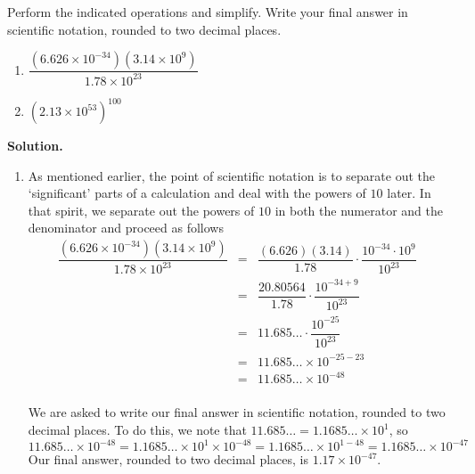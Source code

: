\documentclass{ximera}
\begin{document}
\begin{example} \label{scientificnotationex} Perform the indicated operations and simplify.  Write your final answer in scientific notation, rounded to two decimal places.

\begin{multicols}{2}

\begin{enumerate}

\item  $\dfrac{\left(6.626 \times 10^{-34} \right) \left(3.14 \times 10^{9}\right)}{1.78 \times 10^{23}}$

\item  $\left(2.13 \times 10^{53}\right)^{100}$

\end{enumerate}

\end{multicols}

{\bf Solution.}

\begin{enumerate}

\item  As mentioned earlier, the point of scientific notation is to separate out the `significant' parts of a calculation and deal with the powers of $10$ later.  In that spirit, we separate out the powers of $10$ in both the numerator and the denominator and proceed as follows \[ \begin{array}{rclr}

\dfrac{\left(6.626 \times 10^{-34} \right) \left(3.14 \times 10^{9}\right)}{1.78 \times 10^{23}} & = & \dfrac{(6.626)(3.14)}{1.78} \cdot \dfrac{10^{-34} \cdot 10^{9}}{10^{23}} & \\[8pt]
& = & \dfrac{20.80564}{1.78} \cdot \dfrac{10^{-34 + 9}}{10^{23}} & \\ [8pt]
& = & 11.685 \ldots \cdot \dfrac{10^{-25}}{10^{23}} & \\ [8pt]
& = & 11.685 \ldots \times 10^{-25-23} & \\
& = & 11.685 \ldots \times 10^{-48} & \\
\end{array} \]

We are asked to write our final answer in scientific notation, rounded to two decimal places.  To do this, we note that  $11.685 \ldots = 1.1685 \ldots \times 10^{1}$, so\[ 11.685 \ldots \times 10^{-48} = 1.1685 \ldots \times 10^{1} \times 10^{-48} = 1.1685 \ldots \times 10^{1-48} = 1.1685 \ldots \times 10^{-47} \] Our final answer, rounded to two decimal places, is $1.17 \times 10^{-47}$.  


\end{enumerate}
\end{example}
\end{document}
